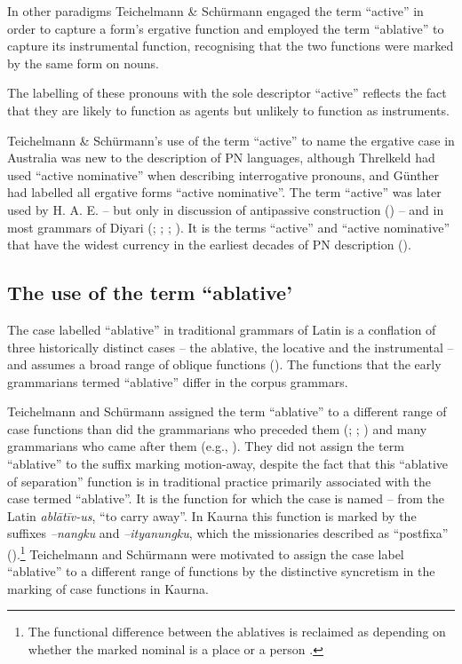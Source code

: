       	       


In other paradigms Teichelmann \& Schürmann engaged the term ``active'' in order to capture a form’s ergative function and employed the term ``ablative'' to capture its instrumental function, recognising that the two functions were marked by the same form on nouns. 

The labelling of these pronouns with the sole descriptor ``active'' reflects the fact that they are likely to function as agents but unlikely to function as instruments. 

Teichelmann \& Schürmann’s use of the term ``active'' to name the ergative case in Australia was new to the description of PN languages, although Threlkeld had used “active nominative” when describing interrogative pronouns, and Günther had labelled all ergative forms ``active nominative''. The term “active” was later used by H. A. E. \citet{meyer_vocabulary_1843} – but only in discussion of antipassive construction () – and in most grammars of Diyari (\citealt{koch_untitled_1868}; \citealt{schoknecht_grammar_1947}; \citealt{flierl_dieri_1880}; ). It is the terms “active” and “active nominative” that have the widest currency in the earliest decades of PN description ().

\subsection{The use of the term “ablative’}
\label{sec:key:5.4.3}

The case labelled “ablative” in traditional grammars of Latin is a conflation of three historically distinct cases -- the ablative, the locative and the instrumental \citep[7]{blake1994} -- and assumes a broad range of oblique functions (). The functions that the early grammarians termed “ablative” differ in the corpus grammars.

Teichelmann and Schürmann assigned the term “ablative” to a different range of case functions than did the grammarians who preceded them (\citealt{threlkeld_australian_1834}; \citealt{gunther_native_1838}; \citeyear{gunther_lecture_1840}) and many grammarians who came after them (e.g., \citealt{kempe_report_1881}). They did not assign the term “ablative” to the suffix marking motion-away, despite the fact that this “ablative of separation” function is in traditional practice primarily associated with the case termed ``ablative''. It is the function for which the case is named – from the Latin \textit{ablātīv-us}, “to carry away”. In Kaurna this function is marked by the suffixes \textit{–nangku} and \textit{–ityanungku}, which the missionaries described as “postfixa” ().\footnote{The functional difference between the ablatives is reclaimed as depending on whether the marked nominal is a place or a person \citep[122]{amery_kulurdu_2013}. }  Teichelmann and Schürmann were motivated to assign the case label “ablative” to a different range of functions by the distinctive syncretism in the marking of case functions in Kaurna.

